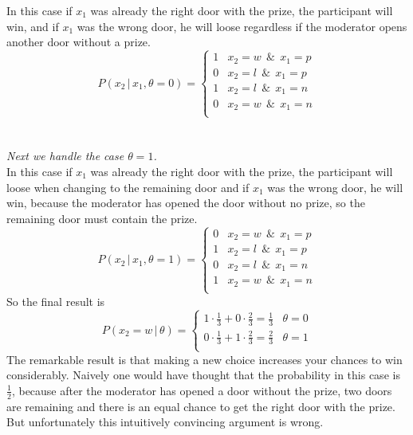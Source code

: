 \documentclass{tstextbook}
\begin{document}
\begin{example}
In this case if $x_1$ was already the right door with the prize, the participant will win, and if $x_1$ was the wrong door, he will loose regardless if the moderator opens another door without a prize.
  \begin{equation}
   P(x_2\,\vert\,x_1,\theta=0)=
\begin{cases}
1 & x_2=w\:\ \&\:\ x_1=p \\
0 & x_2=l\:\ \&\:\ x_1=p \\
1 & x_2=l\:\ \&\:\ x_1=n \\
0 & x_2=w\:\ \&\:\ x_1=n \\
\end{cases}
  \end{equation}
\\
\\  
\textit{Next we handle the case $\theta=1$.}\\

In this case if $x_1$ was already the right door with the prize, the participant will loose when changing to the remaining door and if $x_1$ was the wrong door, he will win, because the moderator has opened the door without no prize, so the remaining door must contain the prize.
  \begin{equation}
   P(x_2\,\vert\,x_1,\theta=1)=
\begin{cases}
0 & x_2=w\:\ \&\:\ x_1=p \\
1 & x_2=l\:\ \&\:\ x_1=p \\
0 & x_2=l\:\ \&\:\ x_1=n \\
1 & x_2=w\:\ \&\:\ x_1=n \\
\end{cases}                    
  \end{equation}
So the final result is
  \begin{equation}
   P(x_2=w\,\vert\,\theta)=
\begin{cases}
1\cdot\frac{1}{3}+0\cdot\frac{2}{3}=\frac{1}{3} & \theta=0 \\
0\cdot\frac{1}{3}+1\cdot\frac{2}{3}=\frac{2}{3} & \theta=1 \\
\end{cases}
  \end{equation}  
The remarkable result is that making a new choice increases your chances to win considerably. Naively one would have thought that the probability in this case is $\frac{1}{2}$, because after the moderator has opened a door without the prize, two doors are remaining and there is an equal chance to get the right door with the prize. But unfortunately this intuitively convincing argument is wrong.\\


\end{example}
\end{document}
